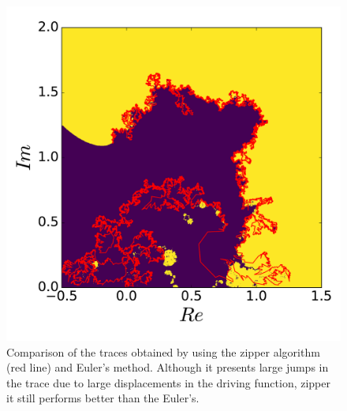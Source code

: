 \begin{figure}
\begin{center}
    \includegraphics[scale=0.5]{chapters/ch4-sle/figs/eulerzip}
\end{center}
\caption{Comparison of the traces obtained by using the zipper algorithm (red
    line) and Euler's method. Although it presents large jumps in the trace due
    to large displacements in the driving function, zipper it still performs
    better than the Euler's.}
\label{fig:eulerzip}
\end{figure}

